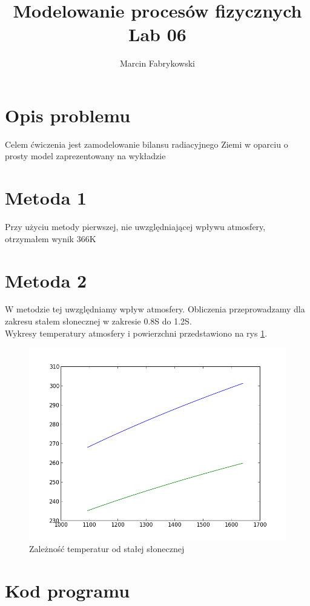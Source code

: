 \documentclass[a4paper,12pt]{article}
\author{Marcin Fabrykowski}
\title{Modelowanie procesów fizycznych\\Lab 06}
\begin{document}
\maketitle
\newpage
\section{Opis problemu}
Celem ćwiczenia jest zamodelowanie bilansu radiacyjnego Ziemi w oparciu o prosty model zaprezentowany na wykładzie
\section{Metoda 1}
Przy użyciu metody pierwszej, nie uwzględniającej wpływu atmosfery, otrzymałem wynik 366K
\section{Metoda 2}
W metodzie tej uwzględniamy wpływ atmosfery. Obliczenia przeprowadzamy dla zakresu stałem słonecznej w zakresie 0.8S do 1.2S.\\
Wykresy temperatury atmosfery i powierzchni przedstawiono na rys \ref{fig:zad2}.
\begin{figure}
\hspace{-7em}
\includegraphics{zad2}
\caption{Zależność temperatur od stałej słonecznej}
\label{fig:zad2}
\end{figure}
\section{Kod programu}
\footnotesize

\normalsize
\end{document}
